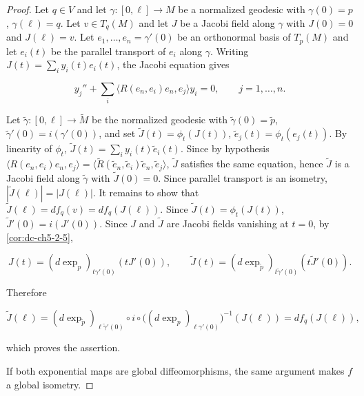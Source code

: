\begin{proof}
\sketch
  Let $q\in V$ and let $\gamma:[0,\ell]\to M$ be a normalized geodesic with
  $\gamma(0)=p$, $\gamma(\ell)=q$. Let $v\in T_q(M)$ and let $J$ be a Jacobi field
  along $\gamma$ with $J(0)=0$ and $J(\ell)=v$. Let $e_1,\dots,e_n=\gamma'(0)$ be an
  orthonormal basis of $T_p(M)$ and let $e_i(t)$ be the parallel transport of $e_i$
  along $\gamma$. Writing $J(t)=\sum_i y_i(t)e_i(t)$, the Jacobi equation gives


  $$
  y_j''+\sum_i\langle R(e_n,e_i)e_n,e_j\rangle y_i=0,\qquad j=1,\dots,n.
  $$


  Let $\tilde{\gamma}:[0,\ell]\to\tilde{M}$ be the normalized geodesic with
  $\tilde{\gamma}(0)=\tilde{p}$, $\tilde{\gamma}'(0)=i(\gamma'(0))$, and set
  $\tilde{J}(t)=\phi_t(J(t))$, $\tilde{e}_j(t)=\phi_t(e_j(t))$. By linearity of
  $\phi_t$, $\tilde{J}(t)=\sum_i y_i(t)\tilde{e}_i(t)$. Since by hypothesis
  $\langle R(e_n,e_i)e_n,e_j\rangle=\langle\tilde{R}(\tilde{e}_n,\tilde{e}_i)\tilde{e}_n,\tilde{e}_j\rangle$,
  $\tilde{J}$ satisfies the same equation, hence $\tilde{J}$ is a Jacobi field along
  $\tilde{\gamma}$ with $\tilde{J}(0)=0$. Since parallel transport is an isometry,
  $|\tilde{J}(\ell)|=|J(\ell)|$. It remains to show that $\tilde{J}(\ell)=df_q(v)=df_q(J(\ell))$.
  Since $\tilde{J}(t)=\phi_t(J(t))$, $\tilde{J}'(0)=i(J'(0))$. Since $J$ and
  $\tilde{J}$ are Jacobi fields vanishing at $t=0$, by \cref{cor:dc-ch5-2-5},


  $$
  J(t)=(d\exp_p)_{t\gamma'(0)}(tJ'(0)),\qquad\tilde{J}(t)=(d\exp_{\tilde{p}})_{t\tilde{\gamma}'(0)}(t\tilde{J}'(0)).
  $$


  Therefore


  $$
  \tilde{J}(\ell)=(d\exp_{\tilde{p}})_{\ell\tilde{\gamma}'(0)}\circ i\circ\big((d\exp_p)_{\ell\gamma'(0)}\big)^{-1}(J(\ell))=df_q(J(\ell)),
  $$


  which proves the assertion.

  If both exponential maps are global diffeomorphisms, the same argument makes $f$
  a global isometry.
\end{proof}

